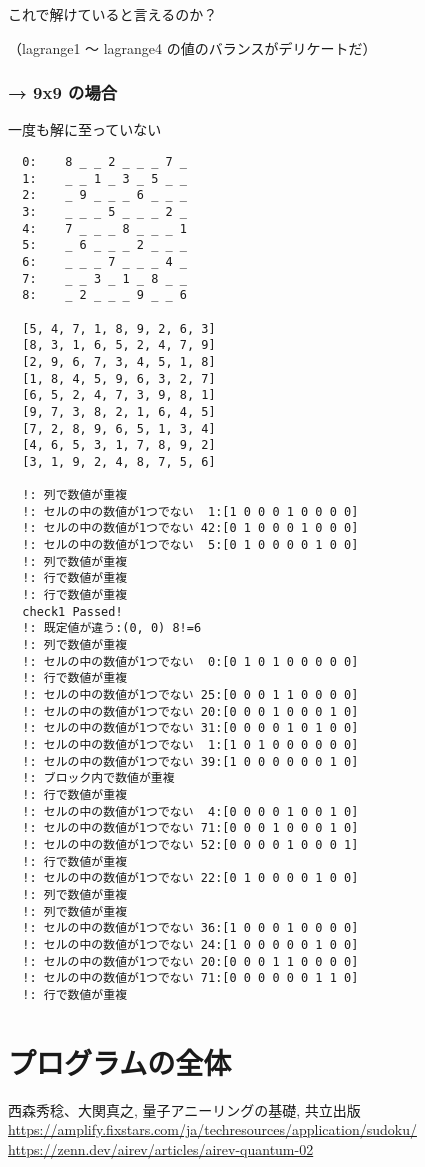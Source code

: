 \documentclass[uplatex,dvipdfmx,a4paper,11pt,oneside,openany]{jsbook}
\begin{document}
これで解けていると言えるのか？

（lagrange1 〜 lagrange4 の値のバランスがデリケートだ）

\subsubsection{→ 9x9 の場合}

一度も解に至っていない

\begin{verbatim}
  0:	8 _ _ 2 _ _ _ 7 _
  1:	_ _ 1 _ 3 _ 5 _ _
  2:	_ 9 _ _ _ 6 _ _ _
  3:	_ _ _ 5 _ _ _ 2 _
  4:	7 _ _ _ 8 _ _ _ 1
  5:	_ 6 _ _ _ 2 _ _ _
  6:	_ _ _ 7 _ _ _ 4 _
  7:	_ _ 3 _ 1 _ 8 _ _
  8:	_ 2 _ _ _ 9 _ _ 6

  [5, 4, 7, 1, 8, 9, 2, 6, 3]
  [8, 3, 1, 6, 5, 2, 4, 7, 9]
  [2, 9, 6, 7, 3, 4, 5, 1, 8]
  [1, 8, 4, 5, 9, 6, 3, 2, 7]
  [6, 5, 2, 4, 7, 3, 9, 8, 1]
  [9, 7, 3, 8, 2, 1, 6, 4, 5]
  [7, 2, 8, 9, 6, 5, 1, 3, 4]
  [4, 6, 5, 3, 1, 7, 8, 9, 2]
  [3, 1, 9, 2, 4, 8, 7, 5, 6]

  !: 列で数値が重複
  !: セルの中の数値が1つでない  1:[1 0 0 0 1 0 0 0 0]
  !: セルの中の数値が1つでない 42:[0 1 0 0 0 1 0 0 0]
  !: セルの中の数値が1つでない  5:[0 1 0 0 0 0 1 0 0]
  !: 列で数値が重複
  !: 行で数値が重複
  !: 行で数値が重複
  check1 Passed!
  !: 既定値が違う:(0, 0) 8!=6
  !: 列で数値が重複
  !: セルの中の数値が1つでない  0:[0 1 0 1 0 0 0 0 0]
  !: 行で数値が重複
  !: セルの中の数値が1つでない 25:[0 0 0 1 1 0 0 0 0]
  !: セルの中の数値が1つでない 20:[0 0 0 1 0 0 0 1 0]
  !: セルの中の数値が1つでない 31:[0 0 0 0 1 0 1 0 0]
  !: セルの中の数値が1つでない  1:[1 0 1 0 0 0 0 0 0]
  !: セルの中の数値が1つでない 39:[1 0 0 0 0 0 0 1 0]
  !: ブロック内で数値が重複
  !: 行で数値が重複
  !: セルの中の数値が1つでない  4:[0 0 0 0 1 0 0 1 0]
  !: セルの中の数値が1つでない 71:[0 0 0 1 0 0 0 1 0]
  !: セルの中の数値が1つでない 52:[0 0 0 0 1 0 0 0 1]
  !: 行で数値が重複
  !: セルの中の数値が1つでない 22:[0 1 0 0 0 0 1 0 0]
  !: 列で数値が重複
  !: 列で数値が重複
  !: セルの中の数値が1つでない 36:[1 0 0 0 1 0 0 0 0]
  !: セルの中の数値が1つでない 24:[1 0 0 0 0 0 1 0 0]
  !: セルの中の数値が1つでない 20:[0 0 0 1 1 0 0 0 0]
  !: セルの中の数値が1つでない 71:[0 0 0 0 0 0 1 1 0]
  !: 行で数値が重複
\end{verbatim}

\section{プログラムの全体}



\begin{thebibliography}{9}
   西森秀稔、大関真之, 量子アニーリングの基礎, 共立出版
   \url{https://amplify.fixstars.com/ja/techresources/application/sudoku/}
   \url{https://zenn.dev/airev/articles/airev-quantum-02}
\end{thebibliography}
\end{document}
